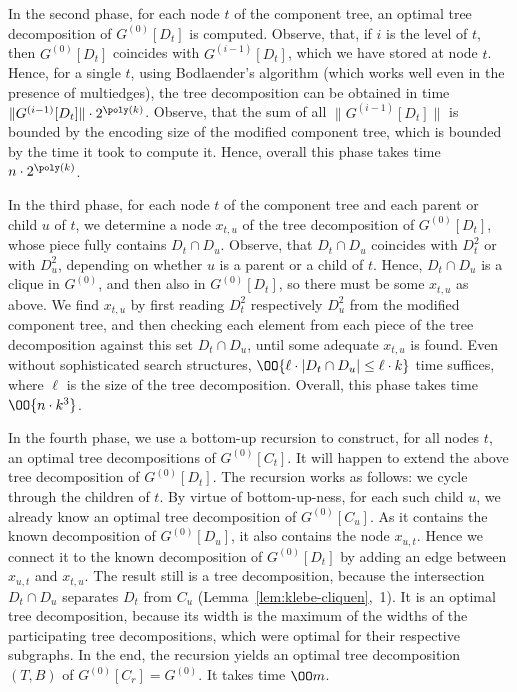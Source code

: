 \documentclass{LMCS}
\begin{document}
In the second phase, for each node $t$ of the component tree, an optimal tree
decomposition of $G^{(0)}[D_t]$ is computed. 
Observe, that, if $i$ is the level of $t$, 
then $G^{(0)}[D_t]$ coincides with $G^{(i-1)}[D_t]$, 
which we have stored at node $t$. 
Hence, for a single $t$, using Bodlaender's algorithm \cite{Bodlaender96} 
(which works well even in the presence of multiedges), 
the tree decomposition can be obtained 
in time $\|G^{(i-1)}[D_t]\|\cdot 2^{\poly(k)}$. 
Observe, that the sum of all $\|G^{(i-1)}[D_t]\|$ 
is bounded by the encoding size of the modified component tree, 
which is bounded by the time it took to compute it. 
Hence, overall this phase takes time $n\cdot 2^{\poly(k)}$. 

In the third phase, for each node $t$ of the component tree 
and each parent or child $u$ of $t$, 
we determine a node $x_{t,u}$ of the tree decomposition of $G^{(0)}[D_t]$, 
whose piece fully contains $D_t\cap D_u$. 
Observe, that $D_t\cap D_u$ coincides with $D^2_t$ or with $D^2_u$, 
depending on whether $u$ is a parent or a child of $t$. 
Hence, $D_t\cap D_u$ is a clique in $G^{(0)}$, 
and then also in $G^{(0)}[D_t]$, so there must be some $x_{t,u}$ as above. 
We find $x_{t,u}$ by first reading $D^2_t$ respectively $D^2_u$ 
from the modified component tree, 
and then checking each element from each piece of the tree decomposition 
against this set $D_t\cap D_u$, 
until some adequate $x_{t,u}$ is found. 
Even without sophisticated search structures, 
$\OO{\ell\cdot |D_t\cap D_u| \leq \ell\cdot k}$ time suffices, 
where $\ell$ is the size of the tree decomposition. 
Overall, this phase takes time $\OO{n\cdot k^3}$. 

In the fourth phase, we use a bottom-up recursion 
to construct, for all nodes $t$, 
an optimal tree decompositions of $G^{(0)}[C_t]$. 
It will happen to extend the above tree decomposition of $G^{(0)}[D_t]$. 
The recursion works as follows: 
we cycle through the children of $t$. 
By virtue of bottom-up-ness, for each such child $u$, 
we already know an optimal tree decomposition of $G^{(0)}[C_u]$. 
As it contains the known decomposition of $G^{(0)}[D_u]$, 
it also contains the node $x_{u,t}$. 
Hence we connect it to the known decomposition of $G^{(0)}[D_t]$ 
by adding an edge between $x_{u,t}$ and $x_{t,u}$. 
The result still is a tree decomposition,
because the intersection $D_t\cap D_u$ separates $D_t$ from $C_u$
(Lemma~\ref{lem:klebe-cliquen},~1). 
It is an optimal tree decomposition, 
because its width is the maximum 
of the widths of the participating tree decompositions,
which were optimal for their respective subgraphs. 
In the end, the recursion yields an optimal tree 
decomposition $(T,B)$ of $G^{(0)}[C_r]=G^{(0)}$. 
It takes time $\OO m$. 
\end{document}
